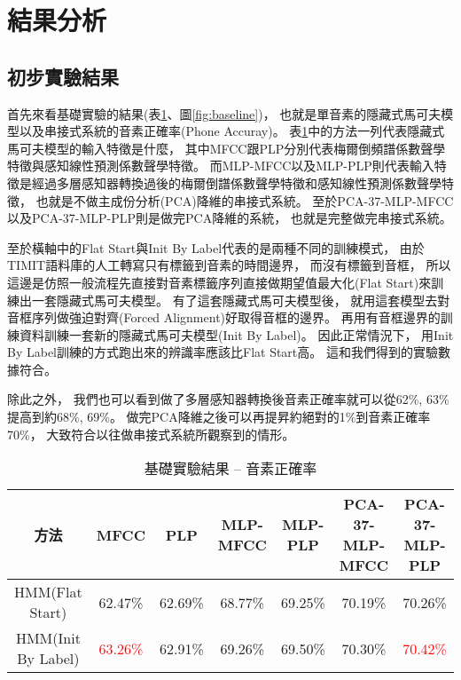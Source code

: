 \section{結果分析}
  \subsection{初步實驗結果}
    首先來看基礎實驗的結果(表\ref{tab:baseline}、圖\ref{fig:baseline})，
    也就是單音素的隱藏式馬可夫模型以及串接式系統的音素正確率(Phone Accuray)。
    表\ref{tab:baseline}中的方法一列代表隱藏式馬可夫模型的輸入特徵是什麼，
    其中MFCC跟PLP分別代表梅爾倒頻譜係數聲學特徵與感知線性預測係數聲學特徵。
    而MLP-MFCC以及MLP-PLP則代表輸入特徵是經過多層感知器轉換過後的梅爾倒譜係數聲學特徵和感知線性預測係數聲學特徵，
    也就是不做主成份分析(PCA)降維的串接式系統。
    至於PCA-37-MLP-MFCC以及PCA-37-MLP-PLP則是做完PCA降維的系統，
    也就是完整做完串接式系統。

    至於橫軸中的Flat Start與Init By Label代表的是兩種不同的訓練模式，
    由於TIMIT語料庫的人工轉寫只有標籤到音素的時間邊界，
    而沒有標籤到音框，
    所以這邊是仿照一般流程先直接對音素標籤序列直接做期望值最大化(Flat Start)來訓練出一套隱藏式馬可夫模型。
    有了這套隱藏式馬可夫模型後，
    就用這套模型去對音框序列做強迫對齊(Forced Alignment)好取得音框的邊界。
    再用有音框邊界的訓練資料訓練一套新的隱藏式馬可夫模型(Init By Label)。
    因此正常情況下，
    用Init By Label訓練的方式跑出來的辨識率應該比Flat Start高。
    這和我們得到的實驗數據符合。

    除此之外，
    我們也可以看到做了多層感知器轉換後音素正確率就可以從62\%, 63\%提高到約68\%, 69\%。
    做完PCA降維之後可以再提昇約絕對的1\%到音素正確率70\%，
    大致符合以往做串接式系統所觀察到的情形。
    
    \newpage
    \begin{table}[htb]
      \begin{center}
	\scalebox{0.8} 
	{
	  \begin{tabular}{|c|c|c|c|c|c|c|}
	  \hline
	  方法 & MFCC & PLP & MLP-MFCC & MLP-PLP & PCA-37-MLP-MFCC & PCA-37-MLP-PLP \\
	  \hline 
	  HMM(Flat Start) & 62.47\% & 62.69\%  & 68.77\% & 69.25\% & 70.19\% & 70.26\% \\ 
	  \hline 
	  HMM(Init By Label) & \textcolor{red}{63.26\%} & 62.91\%  & 69.26\% & 69.50\% & 70.30\% & \textcolor{red}{70.42\%} \\
	  \hline
	  \end{tabular} 
	}
      \end{center}
      \caption{基礎實驗結果 -- 音素正確率}
      \label{tab:baseline}
    \end{table}

